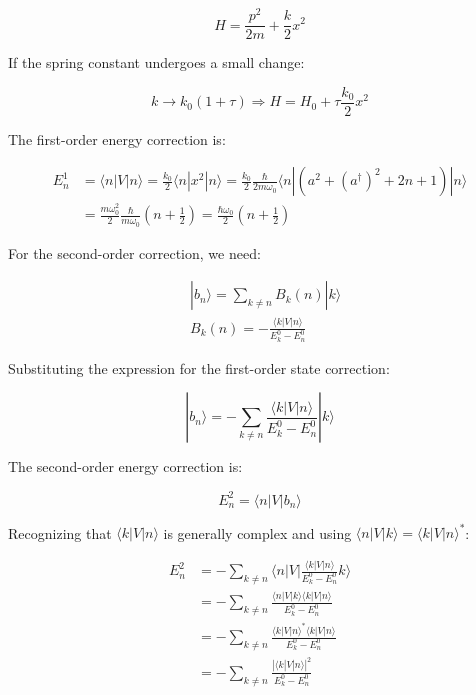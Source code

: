 \documentclass[italian]{HKNdocument}
\begin{document}
\begin{equation}
H=\frac{p^2}{2m}+\frac{k}{2}x^2
\end{equation}

If the spring constant undergoes a small change:

\begin{equation}
k\rightarrow k_0(1+\tau)\Rightarrow H=H_0+\tau\frac{k_0}{2}x^2
\end{equation}

The first-order energy correction is:

\begin{align}
E_n^1&=\langle n|V|n\rangle=\frac{k_0}{2}\langle n|x^2|n\rangle=\frac{k_0}{2}\frac{\hbar}{2m\omega_0}\langle n|(a^2+(a^\dagger)^2+2n+1)|n\rangle\\
&=\frac{m\omega_0^2}{2}\frac{\hbar}{m\omega_0}(n+\frac{1}{2})=\frac{\hbar\omega_0}{2}(n+\frac{1}{2})
\end{align}

For the second-order correction, we need:

\begin{align}
&|b_n\rangle=\sum_{k\neq n}B_k(n)|k\rangle \\
&B_k(n)=-\frac{\langle k|V|n\rangle}{E_k^0-E_n^0}
\end{align}


Substituting the expression for the first-order state correction:

\begin{equation}
|b_n\rangle=-\sum_{k\neq n}\frac{\langle k|V|n\rangle}{E_k^0-E_n^0}|k\rangle
\end{equation}

The second-order energy correction is:

\begin{equation}
E_n^2=\langle n|V|b_n\rangle
\end{equation}

Recognizing that $\langle k|V|n\rangle$ is generally complex and using $\langle n|V|k\rangle=\langle k|V|n\rangle^*$:

\begin{align}
E_n^2&=-\sum_{k\neq n}\langle n|V|\frac{\langle k|V|n\rangle}{E_k^0-E_n^0}k\rangle\\
&=-\sum_{k\neq n}\frac{\langle n|V|k\rangle\langle k|V|n\rangle}{E_k^0-E_n^0}\\
&=-\sum_{k\neq n}\frac{\langle k|V|n\rangle^*\langle k|V|n\rangle}{E_k^0-E_n^0} \\
&=-\sum_{k\neq n}\frac{|\langle k|V|n\rangle|^2}{E_k^0-E_n^0}
\end{align}
\end{document}
